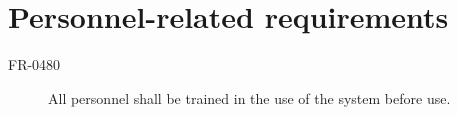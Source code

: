  \section{Personnel-related requirements}
 \begin{description}
 \item[FR-0480] All personnel shall be trained in the use of the system before use. 
 \end{description}